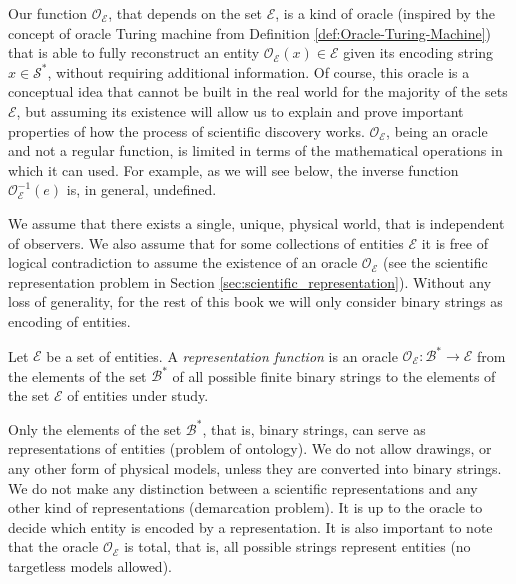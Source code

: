 Our function $\mathcal{O}_\mathcal{E}$, that depends on the set $\mathcal{E}$, is a kind of oracle (inspired by the concept of oracle Turing machine from Definition \ref{def:Oracle-Turing-Machine}) that is able to fully reconstruct an entity $\mathcal{O}_\mathcal{E} (x) \in \mathcal{E}$ given its encoding string $x \in \mathcal{S}^\ast$, without requiring additional information. Of course, this oracle is a conceptual idea that cannot be built in the real world for the majority of the sets $\mathcal{E}$, but assuming its existence will allow us to explain and prove important properties of how the process of scientific discovery works. $\mathcal{O}_\mathcal{E}$, being an oracle and not a regular function, is limited in terms of the mathematical operations in which it can used. For example, as we will see below, the inverse function $\mathcal{O}_\mathcal{E}^{-1} (e)$ is, in general, undefined. 

We assume that there exists a single, unique, physical world, that is independent of observers. We also assume that for some collections of entities $\mathcal{E}$ it is free of logical contradiction to assume the existence of an oracle $\mathcal{O}_\mathcal{E}$ (see the scientific representation problem in Section \ref{sec:scientific_representation}). Without any loss of generality, for the rest of this book we will only consider binary strings as encoding of entities.

\begin{definition}
\label{def:descriptions_topic}
Let $\mathcal{E}$ be a set of entities. A \emph{representation function} is an oracle $\mathcal{O}_\mathcal{E}:\mathcal{B}^\ast \rightarrow \mathcal{E}$ from the elements of the set $\mathcal{B}^\ast$ of all possible finite binary strings to the elements of the set $\mathcal{E}$ of entities under study.
\end{definition}

Only the elements of the set $\mathcal{B}^\ast$, that is, binary strings, can serve as representations of entities (problem of ontology). We do not allow drawings, or any other form of physical models, unless they are converted into binary strings. We do not make any distinction between a scientific representations and any other kind of representations (demarcation problem). It is up to the oracle to decide which entity is encoded by a representation. It is also important to note that the oracle $\mathcal{O}_\mathcal{E}$ is total, that is, all possible strings represent entities (no targetless models allowed).

